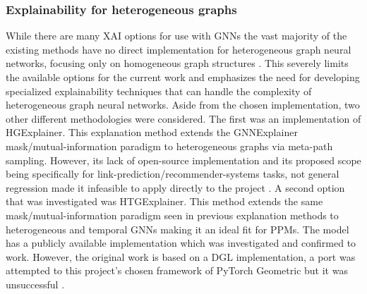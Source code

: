     \subsubsection{Explainability for heterogeneous graphs}
        While there are many XAI options for use with GNNs the vast majority of the existing methods have no direct implementation for heterogeneous graph neural networks, focusing only on homogeneous graph structures \cite{yuan2022} \cite{nandan2025}. This severely limits the available options for the current work and emphasizes the need for developing specialized explainability techniques that can handle the complexity of heterogeneous graph neural networks.
        Aside from the chosen implementation, two other different methodologies were considered. The first was an implementation of HGExplainer. This explanation method extends the GNNExplainer mask/mutual-information paradigm to heterogeneous graphs via meta-path sampling. However, its lack of open-source implementation and its proposed scope being specifically for link-prediction/recommender-systems tasks, not general regression made it infeasible to apply directly to the project \cite{mika2023}.
        A second option that was investigated was HTGExplainer. This method extends the same mask/mutual-information paradigm seen in previous explanation methods to heterogeneous and temporal GNNs making it an ideal fit for PPMs. The model has a publicly available implementation which was investigated and confirmed to work. However, the original work is based on a DGL implementation, a port was attempted to this project's chosen framework of PyTorch Geometric but it was unsuccessful \cite{li2023}.

